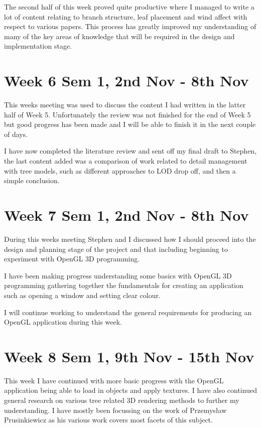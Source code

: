 \documentclass[11pt]{article}
\begin{document}
The second half of this week proved quite productive where I managed to write a lot 
of content relating to branch structure, leaf placement and wind affect with respect 
to various papers. This process has greatly improved my understanding of many of the 
key areas of knowledge that will be required in the design and implementation stage.

\section*{Week 6 Sem 1, 2nd Nov - 8th Nov}
This weeks meeting was used to discuss the content I had written in the latter half of 
Week 5. Unfortunately the review was not finished for the end of Week 5 but good progress 
has been made and I will be able to finish it in the next couple of days.

I have now completed the literature review and sent off my final draft to Stephen, the 
last content added was a comparison of work related to detail management with tree models, 
such as different approaches to LOD drop off, and then a simple conclusion.

\section*{Week 7 Sem 1, 2nd Nov - 8th Nov}
During this weeks meeting Stephen and I discussed how I should proceed into the design and 
planning stage of the project and that including beginning to experiment with OpenGL 3D 
programming.

I have been making progress understanding some basics with OpenGL 3D programming 
gathering together the fundamentals for creating an application such as opening a window and 
setting clear colour. 

I will continue working to understand the general requirements for producing an OpenGL 
application during this week.

\section*{Week 8 Sem 1, 9th Nov - 15th Nov}
This week I have continued with more basic progress with the OpenGL application being able 
to load in objects and apply textures. I have also continued general research on various 
tree related 3D rendering methods to further my understanding. I have mostly been focussing 
on the work of Przemys\l{}aw Prusinkiewicz as his various work covers most facets of this subject.
\end{document}
